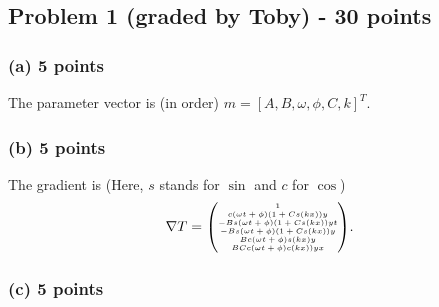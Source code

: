 \documentclass[11pt]{article}
\begin{document}
\subsection*{Problem 1 (graded by Toby) - 30 points}
\subsubsection*{(a) 5 points}

The parameter vector is (in order) $m = [A, B, \omega, \phi, C, k]^T$.

\subsubsection*{(b) 5 points}

The gradient is (Here, $s$ stands for $\sin$ and $c$ for $\cos$)
\begin{equation}
\tiny{        \nonumber \nabla T =
\begin{pmatrix} 
1\\ 
c(\omega t + \phi)    (1+Cs(kx))   y\\
-Bs(\omega t + \phi)    (1+C s(kx))   yt\\ 
-Bs(\omega t + \phi)    (1+C s(kx))   y\\
B c(\omega t + \phi)    s(kx)   y\\
BC c(\omega t + \phi)    c(kx))   yx
\end{pmatrix}}.
\end{equation}

\subsubsection*{(c) 5 points}
\end{document}
